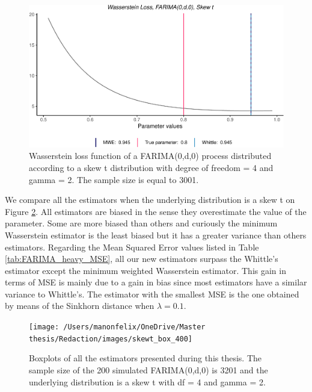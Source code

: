 \documentclass[
  11pt,
]{article}
\begin{document}
\begin{figure}

{\centering \includegraphics[width=0.5\linewidth]{Master_thesis_V3_files/figure-latex/skew_t-1} 

}

\caption{Wasserstein loss function of a FARIMA(0,d,0) process distributed according to a skew t distribution with degree of freedom = 4 and gamma = 2. The sample size is equal to 3001.}\label{fig:skew_t}
\end{figure}

We compare all the estimators when the underlying distribution is a skew
t on Figure \ref{fig:box_farima_skewt}. All estimators are biased in the
sense they overestimate the value of the parameter. Some are more biased
than others and curiously the minimum Wasserstein estimator is the least
biased but it has a greater variance than others estimators. Regarding
the Mean Squared Error values listed in Table
\ref{tab:FARIMA_heavy_MSE}, all our new estimators surpass the Whittle's
estimator except the minimum weighted Wasserstein estimator. This gain
in terms of MSE is mainly due to a gain in bias since most estimators
have a similar variance to Whittle's. The estimator with the smallest
MSE is the one obtained by means of the Sinkhorn distance when
\(\lambda = 0.1\).

\begin{figure}[h]

{\centering \texttt{[image: /Users/manonfelix/OneDrive/Master thesis/Redaction/images/skewt\_box\_400]} 

}

\caption{Boxplots of all the estimators presented during this thesis. The sample size of the 200 simulated FARIMA(0,d,0) is 3201 and the underlying distribution is a skew t with df = 4 and gamma = 2.}\label{fig:box_farima_skewt}
\end{figure}
\end{document}

